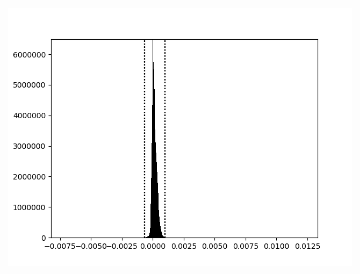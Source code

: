 \documentclass[11pt]{article}
\begin{document}
\begin{figure}[h]
  \centering
  \begin{subfigure}[t]{0.48\textwidth}
    \centering
    \usebox{\largestimage}
  \end{subfigure}
  \hspace{1em}
  \begin{subfigure}[t]{0.48\textwidth}
    \centering
  \end{subfigure}
  \vspace{1em}
  \begin{subfigure}[b]{0.48\textwidth}
    \centering
    \includegraphics[width=0.9\linewidth]{figs/recon_orig_hist}

\end{subfigure}
\end{figure}
\end{document}
